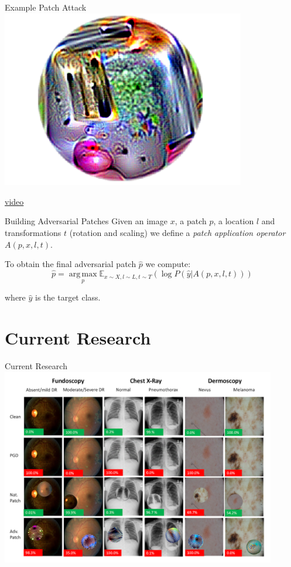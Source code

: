 \documentclass{beamer}
\begin{document}
\begin{frame}{Example Patch Attack}
\centering
\includegraphics[width=0.8\textwidth]{./images/adverse-patch.png}

\href{https://www.youtube.com/watch?v=i1sp4X57TL4}{\alert{video}}
\cite{Brown_Mané_Roy_Abadi_Gilmer_2017}
\end{frame}

\begin{frame}{Building Adversarial Patches}
Given an image $x$, a patch $p$, a location $l$ and transformations $t$ (rotation and scaling) we define a \emph{patch application operator} $A(p, x, l, t)$.
\pause

To obtain the final adversarial patch $\hat{p}$ we compute:
$$
\hat{p} = \operatorname*{arg\,max}_p \mathbb{E}_{x \sim X, l \sim L, t \sim T} (\log P(\hat{y} | A(p, x, l, t)))
$$

where $\hat{y}$ is the target class. \cite{Athalye_Engstrom_Ilyas_Kwok_2017, Brown_Mané_Roy_Abadi_Gilmer_2017}
    
\end{frame}




\section{Current Research}

\begin{frame}{Current Research}
\centering
\includegraphics[width=0.9\textwidth]{./images/adverse-medical.png}

\cite{Finlayson_Chung_Kohane_Beam_2018}
\end{frame}
\end{document}
